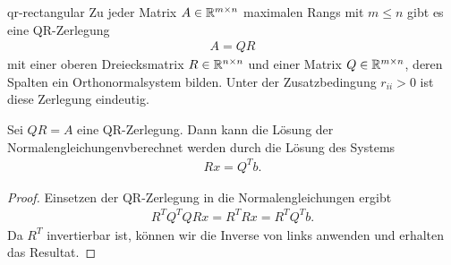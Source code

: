 \begin{Lemma}{qr-rectangular}
  Zu jeder Matrix $A\in \mathbb R^{m\times n}$ maximalen Rangs mit $m\le n$
  gibt es eine QR-Zerlegung
  \begin{gather}
  A = QR
  \end{gather}
  mit einer oberen Dreiecksmatrix $R\in\mathbb R^{n\times n}$ und einer Matrix $Q\in\mathbb R^{m\times n}$, deren Spalten ein Orthonormalsystem bilden.
  Unter der Zusatzbedingung $r_{ii}>0$ ist
  diese Zerlegung eindeutig.
\end{Lemma}

\begin{Satz}
  Sei $QR=A$ eine QR-Zerlegung. Dann kann die Lösung der Normalengleichungenvberechnet werden durch die Lösung des Systems
  \begin{gather}
    Rx = Q^Tb.
  \end{gather}
\end{Satz}

\begin{proof}
  Einsetzen der QR-Zerlegung in die Normalengleichungen ergibt
  \begin{gather}
  R^TQ^TQR x = R^T R x = R^TQ^T b.
  \end{gather}
  Da $R^T$ invertierbar ist, können wir die Inverse von links anwenden und erhalten das Resultat.
\end{proof}


